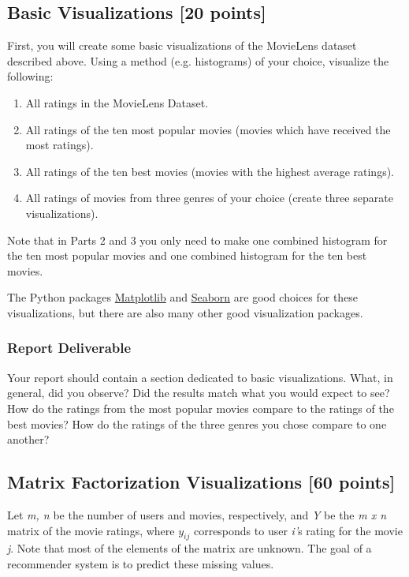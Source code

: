 \subsection{Basic Visualizations [20 points]}
First, you will create some basic visualizations of the MovieLens dataset described above. Using a method (e.g. histograms) of your choice, visualize the following:

\begin{enumerate}
	\item All ratings in the MovieLens Dataset.
	\item All ratings of the ten most popular movies (movies which have received the most ratings).
	\item All ratings of the ten best movies (movies with the highest average ratings).
	\item All ratings of movies from three genres of your choice (create three separate visualizations).
\end{enumerate}

Note that in Parts 2 and 3 you only need to make one combined histogram for the ten most popular movies and one combined histogram for the ten best movies.


The Python packages \href{http://matplotlib.org/} {Matplotlib} and \href{http://seaborn.pydata.org/} {Seaborn} are good choices for these visualizations, but there are also many other good visualization packages.

\subsubsection{Report Deliverable}
Your report should contain a section dedicated to basic visualizations. What, in general, did you observe? Did the results match what you would expect to see? How do the ratings from the most popular movies compare to the ratings of the best movies? How do the ratings of the three genres you chose compare to one another?

\subsection{Matrix Factorization Visualizations [60 points]}
Let \textit{m, n} be the number of users and movies, respectively, and \textit{Y} be the \textit{m x n} matrix of the movie ratings, where $y_{ij}$ corresponds to user \textit{i'}s rating for the movie \textit{j}. Note that most of the elements of the matrix are unknown. The goal of a recommender system is to predict these missing values.

